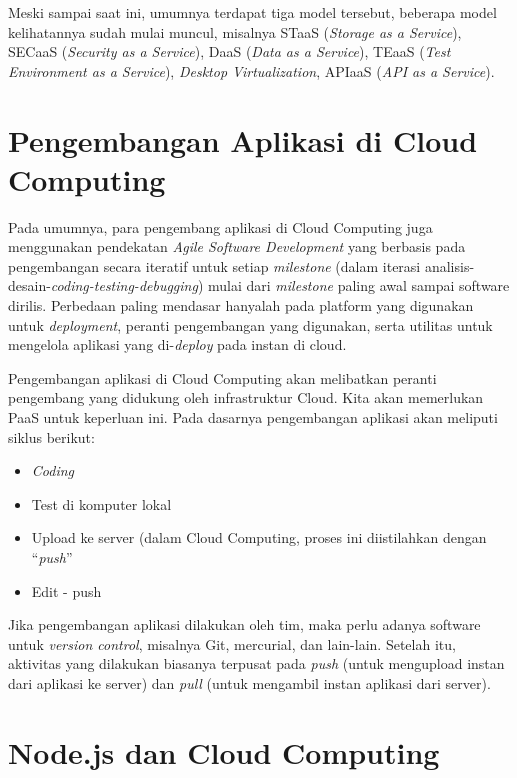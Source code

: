 Meski sampai saat ini, umumnya terdapat tiga model tersebut, beberapa model kelihatannya sudah mulai muncul, misalnya STaaS (\textit{Storage as a Service}), SECaaS (\textit{Security as a Service}), DaaS (\textit{Data as a Service}), TEaaS (\textit{Test Environment as a Service}), \textit{Desktop Virtualization}, APIaaS (\textit{API as a Service}).

\section{Pengembangan Aplikasi di Cloud Computing}

Pada umumnya, para pengembang aplikasi di Cloud Computing juga menggunakan pendekatan \textit{Agile Software Development} yang berbasis pada pengembangan secara iteratif untuk setiap \textit{milestone} (dalam iterasi analisis-desain-\textit{coding-testing-debugging}) mulai dari \textit{milestone} paling awal sampai software dirilis. Perbedaan paling mendasar hanyalah pada platform yang digunakan untuk \textit{deployment}, peranti pengembangan yang digunakan, serta utilitas untuk mengelola aplikasi yang di-\textit{deploy} pada instan di cloud.

Pengembangan aplikasi di Cloud Computing akan melibatkan peranti pengembang yang didukung oleh infrastruktur Cloud. Kita akan memerlukan PaaS untuk keperluan ini. Pada dasarnya pengembangan aplikasi akan meliputi siklus berikut:

\begin{itemize}
  \item \textit{Coding}
  \item Test di komputer lokal
  \item Upload ke server (dalam Cloud Computing, proses ini diistilahkan dengan ``\textit{push}''
  \item Edit - push
\end{itemize}

Jika pengembangan aplikasi dilakukan oleh tim, maka perlu adanya software untuk \textit{version control}, misalnya Git, mercurial, dan lain-lain. Setelah itu, aktivitas yang dilakukan biasanya terpusat pada \textit{push} (untuk mengupload instan dari aplikasi ke server) dan \textit{pull} (untuk mengambil instan aplikasi dari server).

\section{Node.js dan Cloud Computing}

